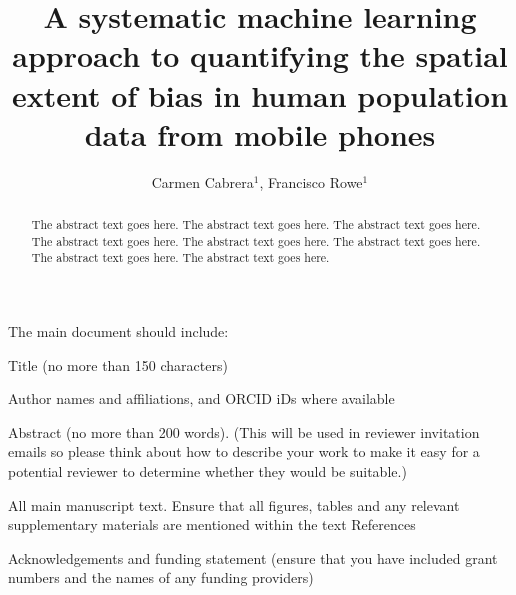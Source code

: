 \documentclass[]{rsos}%
\begin{document}
\title{A systematic machine learning approach to quantifying the spatial extent of bias in human population data from mobile phones}

\author{
Carmen Cabrera$^{1}$,
Francisco Rowe$^{1}$}

\address{
  $^{1}$Geographic Data Science Lab, Department of Geography and Planning, University of Liverpool, Liverpool, United Kingdom.\\
  $^{}$}
\subject{
Mobile phone data,
Human mobility,
Explainable AI,
Spatial analysis}



\begin{abstract}
The abstract text goes here. The abstract text goes here. The abstract text goes here. The abstract text goes here. The abstract text goes here. The abstract text goes here. The abstract text goes here. The abstract text goes here.
\end{abstract}

\providecommand{\EndFirstPage}{%
}

\maketitle

The main document should include:

Title (no more than 150 characters)

Author names and affiliations, and ORCID iDs where available

Abstract (no more than 200 words). (This will be used in reviewer
invitation emails so please think about how to describe your work to
make it easy for a potential reviewer to determine whether they would be
suitable.)

All main manuscript text. Ensure that all figures, tables and any
relevant supplementary materials are mentioned within the text
References

Acknowledgements and funding statement (ensure that you have included
grant numbers and the names of any funding providers)
\end{document}
